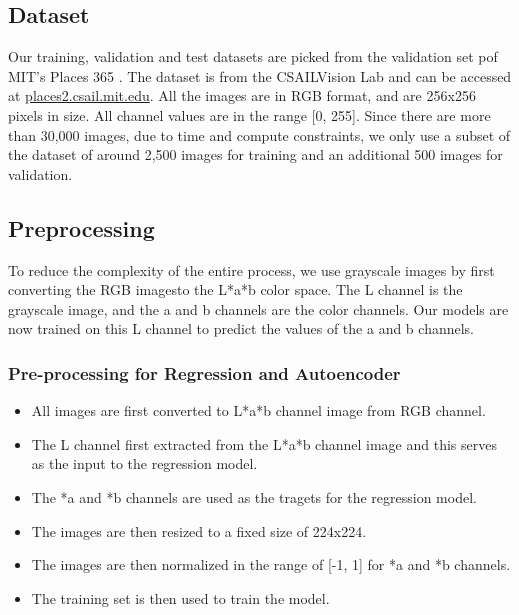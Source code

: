 \documentclass{article}
\begin{document}
\subsection{Dataset}
Our training, validation and test datasets are picked from the validation set pof MIT's Places 365 \cite{7} . The dataset is from the CSAILVision Lab and can be accessed at \url{places2.csail.mit.edu}.
All the images are in RGB format, and are 256x256 pixels in size. All channel values are in the range [0, 255].
Since there are more than 30,000 images, due to time and compute constraints, we only use a subset of the dataset of around 2,500 images for training and an additional 500 images for validation.

\subsection{Preprocessing}
To reduce the complexity of the entire process, we use grayscale images by first converting the RGB imagesto the L*a*b color space.
The L channel is the grayscale image, and the a and b channels are the color channels.
Our models are now trained on this L channel to predict the values of the a and b channels.

\subsubsection{Pre-processing for Regression and Autoencoder}
\begin{itemize}
    \item All images are first converted to L*a*b channel image from RGB channel.
    \item The L channel first extracted from the L*a*b channel image and this serves as the input to the regression model.
    \item The *a and *b channels are used as the tragets for the regression model.
    \item The images are then resized to a fixed size of 224x224.
    \item The images are then normalized in the range of [-1, 1] for *a and *b channels.
    \item The training set is then used to train the model.
\end{itemize}
\end{document}
